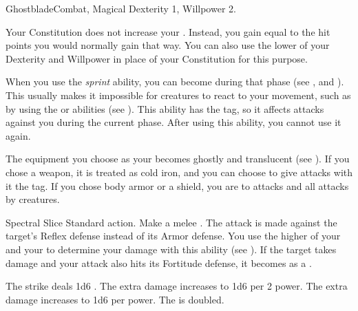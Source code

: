  \begin{magicalfeat}{Ghostblade}{Combat, Magical}
    \featpre Dexterity 1, Willpower 2.

     Your Constitution does not increase your .
    Instead, you gain  equal to the hit points you would normally gain that way.
    You can also use the lower of your Dexterity and Willpower in place of your Constitution for this purpose.

     When you use the \textit{sprint} ability, you can become  during that phase (see , and ).
    This usually makes it impossible for creatures to react to your movement, such as by using the  or  abilities (see ).
    This ability has the  tag, so it affects attacks against you during the current phase.
    After using this ability, you  cannot use it again.

     The equipment you choose as your  becomes ghostly and translucent (see ).
    If you chose a weapon, it is treated as cold iron, and you can choose to give attacks with it the \atCold tag.
    If you chose body armor or a shield, you are  to \atCold attacks and all attacks by  creatures.

    \begin{magicalactiveability}{Spectral Slice}
      \abilityusagetime Standard action.
      \rankline
      Make a melee .
      The attack is made against the target's Reflex defense instead of its Armor defense.
      You use the higher of your  and your  to determine your damage with this ability (see ).
      \hit If the target takes damage and your attack also hits its Fortitude defense, it becomes \slowed as a .

      \rankline
       The strike deals 1d6 .
       The extra damage increases to 1d6  per 2 power.
       The extra damage increases to 1d6  per power.
       The  is doubled.
    \end{magicalactiveability}


\end{magicalfeat}
